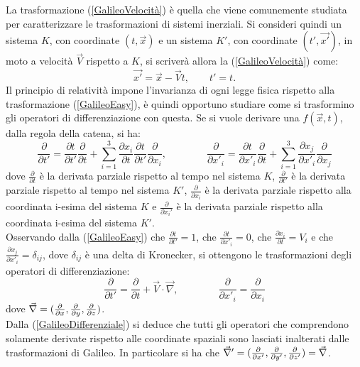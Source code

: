 La trasformazione (\ref{GalileoVelocità}) è quella che viene comunemente studiata per caratterizzare le trasformazioni di sistemi inerziali. 
Si consideri quindi un sistema $K$, con coordinate $(t,\vec{x})$ e un sistema $K'$, con 
coordinate $(t',\vec{x'})$, in moto a velocità $\vec{V}$ rispetto a $K$, si scriverà allora la 
(\ref{GalileoVelocità}) come:
\begin{equation}
	\vec{x'}=\vec{x}-\vec{V}t, \qquad t'=t.
	\label{GalileoEasy}
\end{equation}
Il principio di relatività impone l'invarianza di ogni legge fisica rispetto alla trasformazione (\ref{GalileoEasy}), è quindi opportuno
studiare come si trasformino gli operatori di differenziazione con questa.
Se si vuole derivare una $f(\vec{x},t)$, dalla regola della catena, si ha:
\begin{equation*}
		\frac{\partial}{\partial t'}=\frac{\partial t}{\partial t'}\frac{\partial}{\partial t}+
		\sum_{i=1}^{3}\frac{\partial x_i}{\partial t}\frac{\partial t}{\partial t'}
		\frac{\partial}{\partial x_i}, \qquad \qquad
		\frac{\partial}{\partial x'_i}=\frac{\partial t}{\partial x'_i}\frac{\partial}{\partial t}+
		\sum_{i=1}^{3}\frac{\partial x_j}{\partial x'_i}\frac{\partial}{\partial x_j}
\end{equation*}
dove $\frac{\partial}{\partial t}$ è la derivata parziale rispetto al tempo nel sistema $K$, $\frac{\partial}{\partial t'}$ è la derivata parziale rispetto al tempo nel sistema $K'$, $\frac{\partial}{\partial x_i}$ è la derivata parziale rispetto alla coordinata i-esima del sistema $K$ e $\frac{\partial}{\partial x_i'}$ è la derivata parziale rispetto alla coordinata i-esima del sistema $K'$.\\Osservando dalla (\ref{GalileoEasy}) che $\frac{\partial t}{\partial t'}=1$, che 
$\frac{\partial t}{\partial x'_i}=0$, che $\frac{\partial x_i}{\partial t}=V_i$ e che 
$\frac{\partial x_j}{\partial x'_i}=\delta_{ij}$, dove $\delta_{ij}$ è una delta di Kronecker, 
si ottengono le trasformazioni degli operatori di differenziazione:
\begin{equation}
	\frac{\partial}{\partial t'}=\frac{\partial}{\partial t}+\vec{V}\cdot\vec{\nabla}, \qquad \qquad
	\frac{\partial}{\partial x'_i}=\frac{\partial}{\partial x_i}
	\label{GalileoDifferenziale}
\end{equation}
dove $\vec{\nabla}=(\frac{\partial }{\partial x},\frac{\partial }{\partial y},\frac{\partial }{\partial z})$.\\
Dalla (\ref{GalileoDifferenziale}) si deduce che tutti gli operatori che comprendono solamente derivate 
rispetto alle coordinate spaziali sono lasciati inalterati dalle trasformazioni di Galileo. In particolare si ha che $\vec{\nabla}'=(\frac{\partial }{\partial x'},\frac{\partial }{\partial y'},\frac{\partial }{\partial z'})=\vec{\nabla}$.\\

